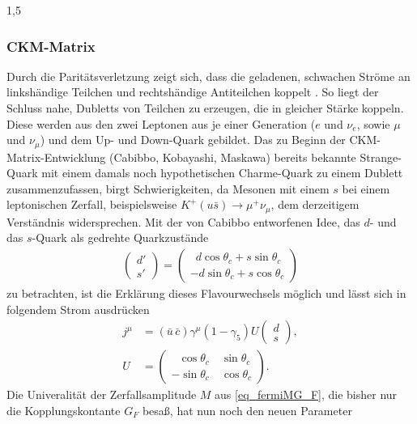 \documentclass[11pt,a4paper,twoside]{report}
\begin{document}
\begin{spacing}{1,5}
\subsubsection{CKM-Matrix}
\vspace{-0.7cm}
Durch die Paritätsverletzung zeigt sich, dass die geladenen, schwachen Ströme an linkshändige Teilchen und rechtshändige Antiteilchen koppelt \cite{DissForm}\cite{Sibold}. 
So liegt der Schluss nahe, Dubletts von Teilchen zu erzeugen, die in gleicher Stärke koppeln. Diese werden aus den zwei Leptonen aus je einer Generation 
($e$ und $\nu_e$, sowie $\mu$ und $\nu_\mu$) und dem Up- und Down-Quark gebildet. Das zu Beginn der CKM-Matrix-Entwicklung (Cabibbo, Kobayashi, Maskawa) 
bereits bekannte Strange-Quark
mit einem damals noch hypothetischen Charme-Quark zu einem Dublett zusammenzufassen, birgt Schwierigkeiten, da Mesonen mit einem $s$ bei einem leptonischen
Zerfall, beispielsweise $K^+(u\bar s) \rightarrow \mu^+ \nu_\mu$, dem derzeitigem Verständnis widersprechen. Mit der von Cabibbo entworfenen Idee, das $d$-
und das $s$-Quark als gedrehte Quarkzustände 
\begin{align}
 \begin{pmatrix}
  d'\\
  s'
 \end{pmatrix} = \begin{pmatrix}
		  \,\,\,d \cos \theta_c + s \sin \theta_c\\
		  -d \sin \theta_c + s\cos \theta_c
		  \end{pmatrix}
\end{align}
zu betrachten, ist die Erklärung dieses Flavourwechsels möglich und lässt sich in folgendem Strom ausdrücken
\begin{align}
 j^\mu &= (\bar u\, \bar c) \gamma^\mu (1-\gamma_5) U \begin{pmatrix}
                                                      d\\
                                                      s
                                                     \end{pmatrix},\\
 U &= \begin{pmatrix}
      \,\,\,\,\cos \theta_c\quad \sin \theta_c\\
      -\sin \theta_c\quad \cos \theta_c
     \end{pmatrix}.
\end{align}
Die Univeralität der Zerfallsamplitude $M$ aus \eqref{eq_fermiMG_F}, die bisher nur die Kopplungskontante $G_F$ besaß, hat nun noch den neuen Parameter

\end{spacing}
\end{document}

